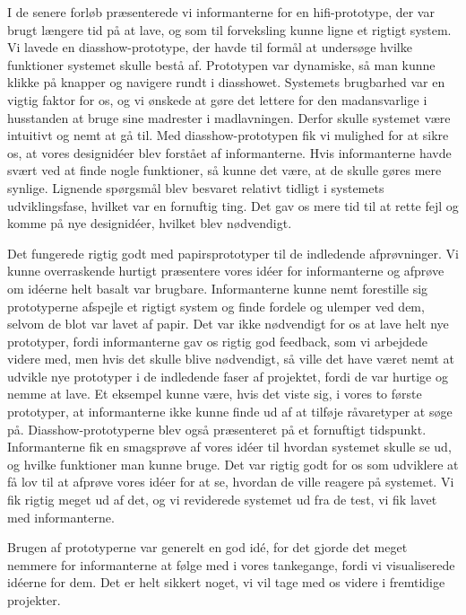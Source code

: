 I de senere forløb præsenterede vi informanterne for en hifi-prototype, der var brugt længere tid på at lave, og som til forveksling kunne ligne et rigtigt system. Vi lavede en diasshow-prototype, der havde til formål at undersøge hvilke funktioner systemet skulle bestå af. Prototypen var dynamiske, så man kunne klikke på knapper og navigere rundt i diasshowet. Systemets brugbarhed var en vigtig faktor for os, og vi ønskede at gøre det lettere for den madansvarlige i husstanden at bruge sine madrester i madlavningen. Derfor skulle systemet være intuitivt og nemt at gå til. Med diasshow-prototypen fik vi mulighed for at sikre os, at vores designidéer blev forstået af informanterne. Hvis informanterne \fx havde svært ved at finde nogle funktioner, så kunne det være, at de skulle gøres mere synlige. Lignende spørgsmål blev besvaret relativt tidligt i systemets udviklingsfase, hvilket var en fornuftig ting. Det gav os mere tid til at rette fejl og komme på nye designidéer, hvilket blev nødvendigt.

Det fungerede rigtig godt med papirsprototyper til de indledende afprøvninger. Vi kunne overraskende hurtigt præsentere vores idéer for informanterne og afprøve om idéerne helt basalt var brugbare. Informanterne kunne nemt forestille sig prototyperne afspejle et rigtigt system og finde fordele og ulemper ved dem, selvom de blot var lavet af papir. Det var ikke nødvendigt for os at lave helt nye prototyper, fordi informanterne gav os rigtig god feedback, som vi arbejdede videre med, men hvis det skulle blive nødvendigt, så ville det have været nemt at udvikle nye prototyper i de indledende faser af projektet, fordi de var hurtige og nemme at lave. Et eksempel kunne være, hvis det viste sig, i vores to første prototyper, at informanterne ikke kunne finde ud af at tilføje råvaretyper at søge på. Diasshow-prototyperne blev også præsenteret på et fornuftigt tidspunkt. Informanterne fik en smagsprøve af vores idéer til hvordan systemet skulle se ud, og hvilke funktioner man kunne bruge. Det var rigtig godt for os som udviklere at få lov til at afprøve vores idéer for at se, hvordan de ville reagere på systemet. Vi fik rigtig meget ud af det, og vi reviderede systemet ud fra de test, vi fik lavet med informanterne.

Brugen af prototyperne var generelt en god idé, for det gjorde det meget nemmere for informanterne at følge med i vores tankegange, fordi vi visualiserede idéerne for dem. Det er helt sikkert noget, vi vil tage med os videre i fremtidige projekter.

